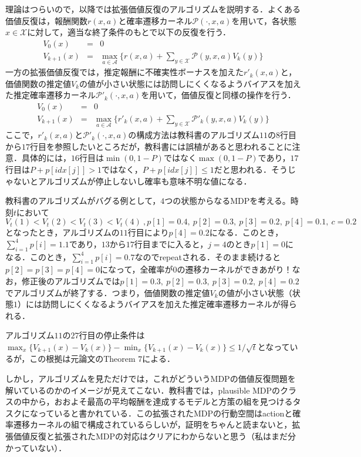 \documentclass{jsarticle}
\begin{document}
理論はつらいので，以降では拡張価値反復のアルゴリズムを説明する．よくある価値反復は，報酬関数$r(x,a)$と確率遷移カーネル$\mathcal{P}(\cdot,x,a)$を用いて，各状態$x\in\mathcal{X}$に対して，適当な終了条件のもとで以下の反復を行う．
\begin{eqnarray*}
V_0(x) &=& 0\\
V_{k+1}(x) &=& \max_{a\in\mathcal{A}} \{ r(x,a) + \sum_{y \in \mathcal{X}}\mathcal{P}(y,x,a)V_{k}(y) \}
\end{eqnarray*}
一方の拡張価値反復では，推定報酬に不確実性ボーナスを加えた$r'_{k}(x,a)$と，価値関数の推定値$V_k$の値が小さい状態には訪問しにくくなるようバイアスを加えた推定確率遷移カーネル$\mathcal{P}'_{k}(\cdot,x,a)$を用いて，価値反復と同様の操作を行う．
\begin{eqnarray*}
V_0(x) &=& 0\\
V_{k+1}(x) &=& \max_{a\in\mathcal{A}} \{ r'_{k}(x,a) + \sum_{y \in \mathcal{X}}\mathcal{P}'_{k}(y,x,a)V_{k}(y) \}
\end{eqnarray*}
ここで，$r'_{k}(x,a)$と$\mathcal{P}'_{k}(\cdot,x,a)$の構成方法は教科書のアルゴリズム$11$の$8$行目から$17$行目を参照したいところだが，教科書には誤植があると思われることに注意．具体的には，$16$行目は$\min(0,1-P)$ではなく$\max(0,1-P)$であり，$17$行目は$P + p[idx[j]] > 1$ではなく，$ P + p[idx[j]] \le 1$だと思われる．そうじゃないとアルゴリズムが停止しないし確率も意味不明な値になる．

教科書のアルゴリズムがバグる例として，$4$つの状態からなるMDPを考える。時刻$t$において$V_t(1) < V_t(2) < V_t(3) < V_t(4)\ , p[1] = 0.4,\ p[2] = 0.3,\ p[3]=0.2,\  p[4] =0.1,\ c=0.2$となったとき，アルゴリズムの$11$行目により$p[4] =0.2$になる．このとき，$\sum_{i=1}^4 p[i] = 1.1$であり，$13$から$17$行目までに入ると，$j=4$のとき$p[1] = 0$になる．このとき，$\sum_{i=1}^4 p[i] = 0.7$なのでrepeatされる．そのまま続けると$p[2]=p[3]=p[4]=0$になって，全確率が$0$の遷移カーネルができあがり！なお，修正後のアルゴリズムでは$p[1]=0.3,\ p[2]=0.3,\ p[3]=0.2,\ p[4]=0.2$でアルゴリズムが終了する．つまり，価値関数の推定値$V_k$の値が小さい状態（状態$1$）には訪問しにくくなるようバイアスを加えた推定確率遷移カーネルが得られる．

アルゴリズム$11$の$27$行目の停止条件は$\max_x \{V_{k+1}(x) - V_{k}(x)\} -\min_x \{V_{k+1}(x) - V_{k}(x)\} \le 1/\sqrt{t}$となっているが，この根拠は元論文のTheorem $7$による．

しかし，アルゴリズムを見ただけでは，これがどういうMDPの価値反復問題を解いているのかのイメージが見えてこない．教科書では，plausible MDPのクラスの中から，おおよそ最高の平均報酬を達成するモデルと方策の組を見つけるタスクになっていると書かれている．この拡張されたMDPの行動空間はactionと確率遷移カーネルの組で構成されているらしいが，証明をちゃんと読まないと，拡張価値反復と拡張されたMDPの対応はクリアにわからないと思う（私はまだ分かっていない）．
\end{document}
